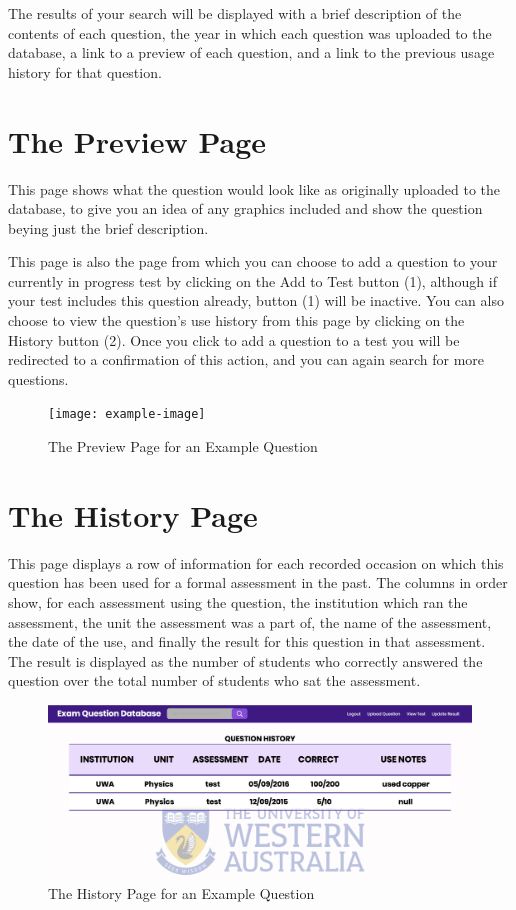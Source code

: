 \documentclass[12pt, a4paper, titlepage]{book}
\begin{document}
The results of your search will be displayed with a brief description of the contents of each question, the year in which each question was uploaded to the database, a link to a preview of each question, and a link to the previous usage history for that question.
\pagebreak
\section{The Preview Page}\label{sec:pre}
This page shows what the question would look like as originally uploaded to the database, to give you an idea of any graphics included and show the question beying just the brief description.\par
This page is also the page from which you can choose to add a question to your currently in progress test by clicking on the Add to Test button (1), although if your test includes this question already, button (1) will be inactive. You can also choose to view the question's use history from this page by clicking on the History button (2). Once you click to add a question to a test you will be redirected to a confirmation of this action, and you can again search for more questions.
\begin{figure}[H]
\centering
\texttt{[image: example-image]}
\caption{The Preview Page for an Example Question}
\end{figure}

\pagebreak
\section{The History Page}
This page displays a row of information for each recorded occasion on which this question has been used for a formal assessment in the past. The columns in order show, for each assessment using the question, the institution which ran the assessment, the unit the assessment was a part of, the name of the assessment, the date of the use, and finally the result for this question in that assessment. The result is displayed as the number of students who correctly answered the question over the total number of students who sat the assessment.
\begin{figure}[H]
\centering
\includegraphics[width = 16cm]{HistoryPage.PNG}
\caption{The History Page for an Example Question}
\end{figure}
\end{document}
